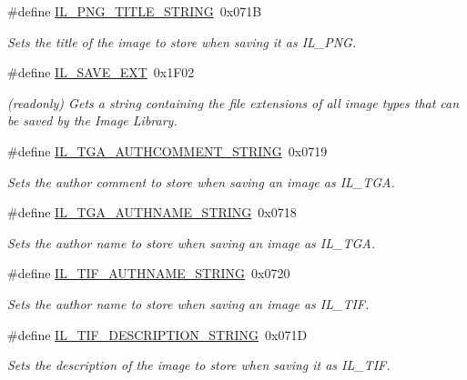 \begin{DoxyCompactItemize}
\#define \hyperlink{group__il__strings_gad4784cb4385f8f3e4d5a9630dd2cd4e3}{I\+L\+\_\+\+P\+N\+G\+\_\+\+T\+I\+T\+L\+E\+\_\+\+S\+T\+R\+I\+N\+G}~0x071\+B
\begin{DoxyCompactList}\small\item\em Sets the title of the image to store when saving it as I\+L\+\_\+\+P\+N\+G. \end{DoxyCompactList}\item 
\#define \hyperlink{group__il__strings_ga8887dab9f528ef7dfcdd4d541c4fd527}{I\+L\+\_\+\+S\+A\+V\+E\+\_\+\+E\+X\+T}~0x1\+F02
\begin{DoxyCompactList}\small\item\em (readonly) Gets a string containing the file extensions of all image types that can be saved by the Image Library. \end{DoxyCompactList}\item 
\#define \hyperlink{group__il__strings_ga9add8e3ef4684d8565433ec0463e4cd7}{I\+L\+\_\+\+T\+G\+A\+\_\+\+A\+U\+T\+H\+C\+O\+M\+M\+E\+N\+T\+\_\+\+S\+T\+R\+I\+N\+G}~0x0719
\begin{DoxyCompactList}\small\item\em Sets the author comment to store when saving an image as I\+L\+\_\+\+T\+G\+A. \end{DoxyCompactList}\item 
\#define \hyperlink{group__il__strings_ga39aaaf93b798bb4c5a64fe600c9385a7}{I\+L\+\_\+\+T\+G\+A\+\_\+\+A\+U\+T\+H\+N\+A\+M\+E\+\_\+\+S\+T\+R\+I\+N\+G}~0x0718
\begin{DoxyCompactList}\small\item\em Sets the author name to store when saving an image as I\+L\+\_\+\+T\+G\+A. \end{DoxyCompactList}\item 
\#define \hyperlink{group__il__strings_gae5e507e7d87ec2a0b05b538b6a4c712a}{I\+L\+\_\+\+T\+I\+F\+\_\+\+A\+U\+T\+H\+N\+A\+M\+E\+\_\+\+S\+T\+R\+I\+N\+G}~0x0720
\begin{DoxyCompactList}\small\item\em Sets the author name to store when saving an image as I\+L\+\_\+\+T\+I\+F. \end{DoxyCompactList}\item 
\#define \hyperlink{group__il__strings_ga8344fd9282d8220a583d5509763eafa5}{I\+L\+\_\+\+T\+I\+F\+\_\+\+D\+E\+S\+C\+R\+I\+P\+T\+I\+O\+N\+\_\+\+S\+T\+R\+I\+N\+G}~0x071\+D
\begin{DoxyCompactList}\small\item\em Sets the description of the image to store when saving it as I\+L\+\_\+\+T\+I\+F. \end{DoxyCompactList}\item 

\end{DoxyCompactItemize}
